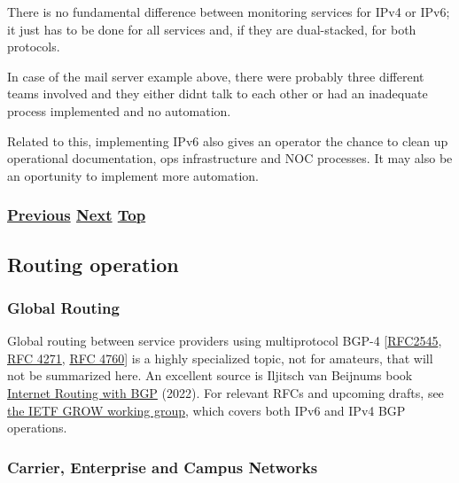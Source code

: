 \documentclass[
]{article}
\begin{document}
There is no fundamental difference between monitoring services for IPv4
or IPv6; it just has to be done for all services and, if they are
dual-stacked, for both protocols.

In case of the mail server example above, there were probably three
different teams involved and they either didn\textquotesingle t talk to
each other or had an inadequate process implemented and no automation.

Related to this, implementing IPv6 also gives an operator the chance to
clean up operational documentation, ops infrastructure and NOC
processes. It may also be an oportunity to implement more automation.

\subsubsection{\texorpdfstring{\hyperref[remote-configuration]{Previous}
\hyperref[routing-operation]{Next}
\hyperref[management-and-operations]{Top}}{Previous Next Top}}\label{previous-next-top-27}

\pagebreak

\subsection{Routing operation}\label{routing-operation}

\subsubsection{Global Routing}\label{global-routing}

Global routing between service providers using multiprotocol BGP-4
{[}\href{https://www.rfc-editor.org/info/rfc2545}{RFC2545},
\href{https://www.rfc-editor.org/info/rfc4271}{RFC 4271},
\href{https://www.rfc-editor.org/info/rfc4760}{RFC 4760}{]} is a highly
specialized topic, not for amateurs, that will not be summarized here.
An excellent source is Iljitsch van Beijnum\textquotesingle s book
\href{https://www.iljitsch.com/2022/11-18-new-e-book-internet-routing-with-bgp.html}{Internet
Routing with BGP} (2022). For relevant RFCs and upcoming drafts, see
\href{https://datatracker.ietf.org/wg/grow/documents/}{the IETF GROW
working group}, which covers both IPv6 and IPv4 BGP operations.

\subsubsection{Carrier, Enterprise and Campus
Networks}\label{carrier-enterprise-and-campus-networks}
\end{document}
